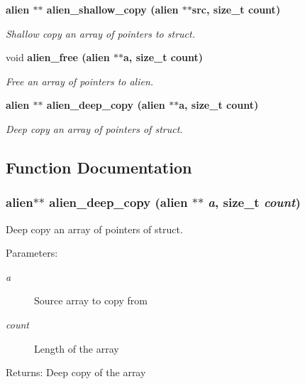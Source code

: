 \begin{CompactItemize}
\bf{alien} $\ast$$\ast$ \bf{alien\_\-shallow\_\-copy} (\bf{alien} $\ast$$\ast$src, size\_\-t count)
\begin{CompactList}\small\item\em Shallow copy an array of pointers to struct. \item\end{CompactList}\item 
void \bf{alien\_\-free} (\bf{alien} $\ast$$\ast$a, size\_\-t count)
\begin{CompactList}\small\item\em Free an array of pointers to alien. \item\end{CompactList}\item 
\bf{alien} $\ast$$\ast$ \bf{alien\_\-deep\_\-copy} (\bf{alien} $\ast$$\ast$a, size\_\-t count)
\begin{CompactList}\small\item\em Deep copy an array of pointers of struct. \item\end{CompactList}\end{CompactItemize}


\subsection{Function Documentation}
\subsubsection{\setlength{\rightskip}{0pt plus 5cm}\bf{alien}$\ast$$\ast$ alien\_\-deep\_\-copy (\bf{alien} $\ast$$\ast$ {\em a}, size\_\-t {\em count})}\label{struct_8h_00765b0af983a449ea6fe7a9ec5114fc}


Deep copy an array of pointers of struct. 

\begin{Desc}
\item[Parameters:]
\begin{description}
\item[{\em a}]Source array to copy from \item[{\em count}]Length of the array \end{description}
\end{Desc}
\begin{Desc}
\item[Returns:]Deep copy of the array \end{Desc}
